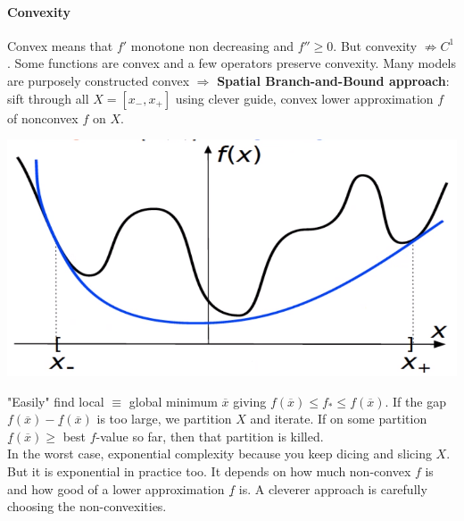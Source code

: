 \documentclass[10pt]{report}
\begin{document}
\paragraph{Convexity} Convex means that $f'$ monotone non decreasing and $f'' \geq 0$. But convexity $\not\Rightarrow C^1$. Some functions are convex and a few operators preserve convexity. Many models are purposely constructed convex $\Rightarrow$  \textbf{Spatial Branch-and-Bound approach}: sift through all $X = [x_-, x_+]$ using clever guide, convex lower approximation \underline{$f$} of nonconvex $f$ on $X$.
\begin{center}
	\includegraphics[scale=0.5]{2.png}
\end{center}
"Easily" find local $\equiv$ global minimum $\overline{x}$ giving \underline{$f$}$(\overline{x}) \leq f_* \leq f(\overline{x})$. If the gap $f(\overline{x}) - \underline{f}(\overline{x})$ is too large, we partition $X$ and iterate. If on some partition $\underline{f}(\overline{x}) \geq$ best $f$-value so far, then that partition is killed.\\
In the worst case, exponential complexity because you keep dicing and slicing $X$. But it is exponential in practice too. It depends on how much non-convex $f$ is and how good of a lower approximation $\underline{f}$ is. A cleverer approach is carefully choosing the non-convexities.
\end{document}
